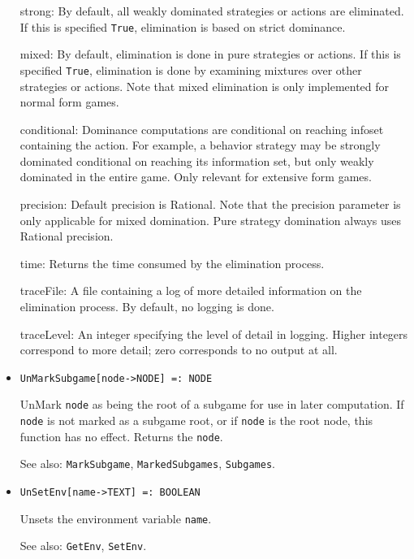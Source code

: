 \begin{itemize}
\bd
\item [strong:] By default, all weakly dominated strategies or actions
are eliminated.  If this is specified \verb+True+, elimination is based
on strict dominance.
\item [mixed:] By default, elimination is done in pure strategies or
actions.  If this is specified \verb+True+, elimination is done by
examining mixtures over other strategies or actions.  Note that mixed 
elimination is only implemented for normal form games.  
\item [conditional:] Dominance computations are conditional on
reaching infoset containing the action.  For example, a behavior
strategy may be strongly dominated conditional on reaching its
information set, but only weakly dominated in the entire game.  Only
relevant for extensive form games.
\item [precision:] Default precision is Rational.  Note that the precision
parameter is only applicable for mixed domination.  Pure strategy
domination always uses Rational precision.
\item [time:] Returns the time consumed by the elimination process.
\item [traceFile:] A file containing a log of more detailed information
on the elimination process.  By default, no logging is done.
\item [traceLevel:] An integer specifying the level of detail in logging.
Higher integers correspond to more detail; zero corresponds to no output
at all.
\ed
\ed

\item{}
\protect \large \begin{verbatim}
UnMarkSubgame[node->NODE] =: NODE 
\end{verbatim}\normalsize

\bd
UnMark \verb+node+ as being the root of a subgame for use in later
computation.  If \verb+node+ is not marked as a subgame root, or if
\verb+node+ is the root node, this function has no effect.  Returns
the \verb+node+.
\item [See also:] \verb+MarkSubgame+, \verb+MarkedSubgames+,
\verb+Subgames+.
\ed


\item{}
\protect \large \begin{verbatim}
UnSetEnv[name->TEXT] =: BOOLEAN 
\end{verbatim} \normalsize

\bd
Unsets the environment variable \verb+name+.
\item [See also:] \verb+GetEnv+, \verb+SetEnv+.
\ed


\end{itemize}
